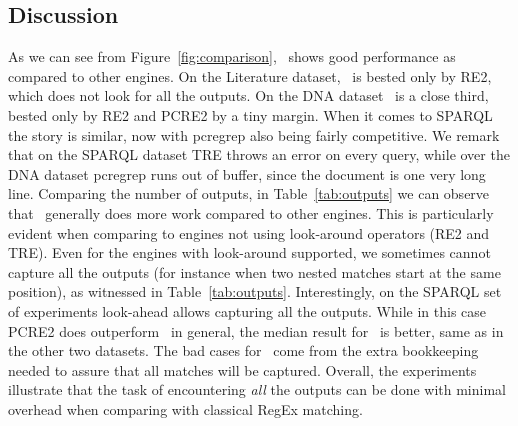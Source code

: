 \subsection{Discussion}
As we can see from Figure~\ref{fig:comparison}, \rematch\ shows good performance
as compared to other engines. On the \textsf{Literature} dataset, \rematch\ is
bested only by \textsf{RE2}, which does not look for all the outputs. On the
\textsf{DNA} dataset \rematch\ is a close third, bested only by \textsf{RE2} and
\textsf{PCRE2} by a tiny margin. When it comes to \textsf{SPARQL} the story is
similar, now with \textsf{pcregrep} also being fairly competitive. We remark
that on the \textsf{SPARQL} dataset \textsf{TRE} throws an error on every query,
while over the \textsf{DNA} dataset \textsf{pcregrep} runs out of buffer, since
the document is one very long line. Comparing the number of outputs, in
Table~\ref{tab:outputs} we can observe that \rematch\ generally does more work
compared to other engines. This is particularly evident when  comparing to
engines not using look-around operators (\textsf{RE2} and \textsf{TRE}). Even
for the engines with look-around supported, we sometimes cannot capture all the
outputs (for instance when two nested matches start at the same position), as
witnessed in Table~\ref{tab:outputs}. Interestingly, on the \textsf{SPARQL} set
of experiments look-ahead allows capturing all the outputs. While in this case
\textsf{PCRE2} does outperform \rematch\ in general, the median result for
\rematch\ is better, same as in the other two datasets. The bad cases for
\rematch\ come from the extra bookkeeping needed to assure that all matches will
be captured. Overall, the experiments illustrate that the task of encountering
\emph{all} the outputs  can be done with minimal overhead when comparing with
classical RegEx matching. 